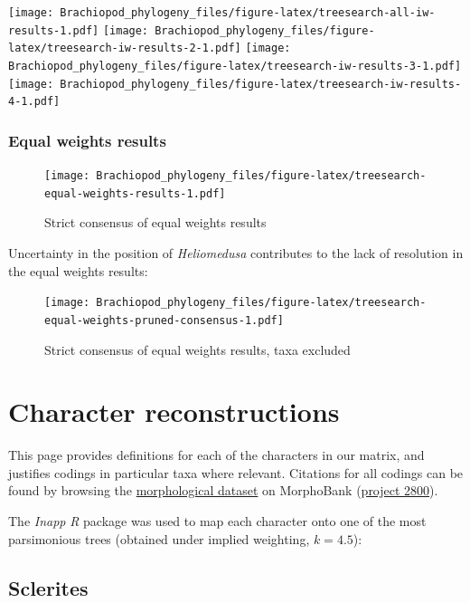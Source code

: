\documentclass[]{book}
\theoremstyle{definition}
\theoremstyle{definition}
\theoremstyle{definition}
\theoremstyle{remark}
\begin{document}
\texttt{[image: Brachiopod\_phylogeny\_files/figure-latex/treesearch-all-iw-results-1.pdf]}
\texttt{[image: Brachiopod\_phylogeny\_files/figure-latex/treesearch-iw-results-2-1.pdf]}
\texttt{[image: Brachiopod\_phylogeny\_files/figure-latex/treesearch-iw-results-3-1.pdf]}
\texttt{[image: Brachiopod\_phylogeny\_files/figure-latex/treesearch-iw-results-4-1.pdf]}

\hypertarget{equal-weights-results}{%
\subsection{Equal weights results}\label{equal-weights-results}}

\begin{figure}
\centering
\texttt{[image: Brachiopod\_phylogeny\_files/figure-latex/treesearch-equal-weights-results-1.pdf]}
\caption{\label{fig:treesearch-equal-weights-results}Strict consensus of
equal weights results}
\end{figure}

Uncertainty in the position of \emph{Heliomedusa} contributes to the
lack of resolution in the equal weights results:

\begin{figure}
\centering
\texttt{[image: Brachiopod\_phylogeny\_files/figure-latex/treesearch-equal-weights-pruned-consensus-1.pdf]}
\caption{\label{fig:treesearch-equal-weights-pruned-consensus}Strict
consensus of equal weights results, taxa excluded}
\end{figure}

\hypertarget{reconstructions}{%
\chapter{Character reconstructions}\label{reconstructions}}

This page provides definitions for each of the characters in our matrix,
and justifies codings in particular taxa where relevant. Citations for
all codings can be found by browsing the
\protect\hyperlink{dataset}{morphological dataset} on MorphoBank
(\href{https://morphobank.org/permalink/?P2800}{project 2800}).

The \emph{Inapp} \emph{R} package \citep{Brazeau2018} was used to map
each character onto one of the most parsimonious trees (obtained under
implied weighting, \(k = 4.5\)):

\hypertarget{sclerites}{%
\section{Sclerites}\label{sclerites}}
\end{document}
